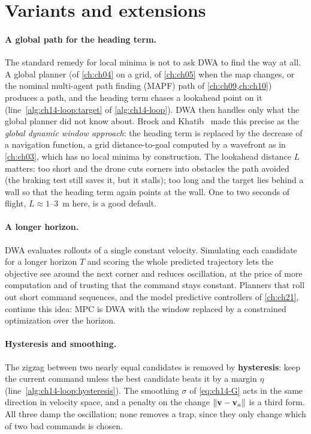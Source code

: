 \section{Variants and extensions}
\label{sec:ch14-variants}

\paragraph{A global path for the heading term.}
The standard remedy for local minima is not to ask DWA to find the way at
all. A global planner (\astar of \cref{ch:ch04} on a grid, \dstarlite of
\cref{ch:ch05} when the map changes, or the nominal multi-agent path finding
(MAPF) path of
\cref{ch:ch09,ch:ch10}) produces a path, and the heading term chases a
lookahead point on it (line~\ref{alg:ch14-loop:target} of
\cref{alg:ch14-loop}). DWA then handles only what the global planner did not
know about. Brock and Khatib~\cite{brock1999global} made this precise as
the \emph{global dynamic window approach}:
the heading term is replaced by the decrease of a navigation function, a
grid distance-to-goal computed by a wavefront as in \cref{ch:ch03}, which
has no local minima by construction. The lookahead distance $L$ matters: too
short and the drone cuts corners into obstacles the path avoided (the
braking test still saves it, but it stalls); too long and the target lies
behind a wall so that the heading term again points at the wall. One to two
seconds of flight, $L \approx 1$--$3$~m here, is a good default.

\paragraph{A longer horizon.}
DWA evaluates rollouts of a single constant velocity. Simulating each
candidate for a longer horizon $T$ and scoring the whole predicted trajectory
lets the objective see around the next corner and reduces oscillation, at the
price of more computation and of trusting that the command stays constant.
Planners that roll out short command sequences, and the model predictive
controllers of \cref{ch:ch21}, continue this idea: MPC is DWA with the window
replaced by a constrained optimization over the horizon.

\paragraph{Hysteresis and smoothing.}
The zigzag between two nearly equal candidates is removed by
\textbf{hysteresis}: keep the current
command unless the best candidate beats it by a margin $\eta$
(line~\ref{alg:ch14-loop:hysteresis}). The smoothing $\sigma$ of
\cref{eq:ch14-G} acts in the same direction in velocity space, and a penalty
on the change $\left\lVert \mathbf{v} - \mathbf{v}_a \right\rVert$ is a third form. All three damp the
oscillation; none removes a trap, since they only change which of two bad
commands is chosen.

